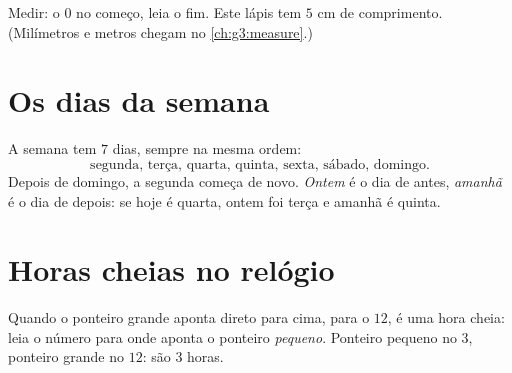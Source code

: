 \begin{omfigure}

{\small Medir: o $0$ no começo, leia o fim. Este lápis tem $5$ cm de
comprimento. (Milímetros e metros chegam no
\cref{ch:g3:measure}.)}
\end{omfigure}

\section{Os dias da semana}

\begin{example}\label{ex:g1:measure:days}
A semana tem $7$ dias, sempre na mesma ordem:
\[
\text{segunda, terça, quarta, quinta, sexta, sábado, domingo.}
\]
Depois de domingo, a segunda começa de novo. \emph{Ontem} é o dia de
antes, \emph{amanhã} é o dia de depois: se hoje é quarta, ontem foi
terça e amanhã é quinta.
\end{example}

\section{Horas cheias no relógio}

\begin{method}\label{met:g1:measure:clock}
Quando o ponteiro grande aponta direto para cima, para o $12$, é uma
hora cheia: leia o número para onde aponta o ponteiro
\emph{pequeno}. Ponteiro pequeno no $3$, ponteiro grande no $12$:
são $3$ horas.
\end{method}

